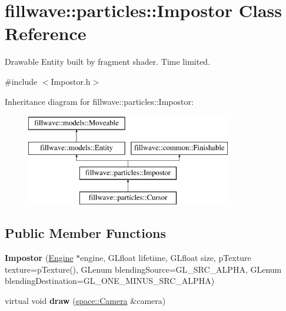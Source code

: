 \hypertarget{classfillwave_1_1particles_1_1Impostor}{}\section{fillwave\+:\+:particles\+:\+:Impostor Class Reference}
\label{classfillwave_1_1particles_1_1Impostor}


Drawable Entity built by fragment shader. Time limited.  




{\ttfamily \#include $<$Impostor.\+h$>$}

Inheritance diagram for fillwave\+:\+:particles\+:\+:Impostor\+:\begin{figure}[H]
\begin{center}
\leavevmode
\includegraphics[height=4.000000cm]{classfillwave_1_1particles_1_1Impostor}
\end{center}
\end{figure}
\subsection*{Public Member Functions}
\begin{DoxyCompactItemize}
\item 
\hypertarget{classfillwave_1_1particles_1_1Impostor_a899285ac9e0ef5aae15dd7c02510ac2b}{}{\bfseries Impostor} (\hyperlink{classfillwave_1_1Engine}{Engine} $\ast$engine, G\+Lfloat lifetime, G\+Lfloat size, p\+Texture texture=p\+Texture(), G\+Lenum blending\+Source=G\+L\+\_\+\+S\+R\+C\+\_\+\+A\+L\+P\+H\+A, G\+Lenum blending\+Destination=G\+L\+\_\+\+O\+N\+E\+\_\+\+M\+I\+N\+U\+S\+\_\+\+S\+R\+C\+\_\+\+A\+L\+P\+H\+A)\label{classfillwave_1_1particles_1_1Impostor_a899285ac9e0ef5aae15dd7c02510ac2b}

\item 
\hypertarget{classfillwave_1_1particles_1_1Impostor_ae45f2c8edccb5546f4eef14c7aaf5c99}{}virtual void {\bfseries draw} (\hyperlink{classfillwave_1_1space_1_1Camera}{space\+::\+Camera} \&camera)\label{classfillwave_1_1particles_1_1Impostor_ae45f2c8edccb5546f4eef14c7aaf5c99}

\end{DoxyCompactItemize}
